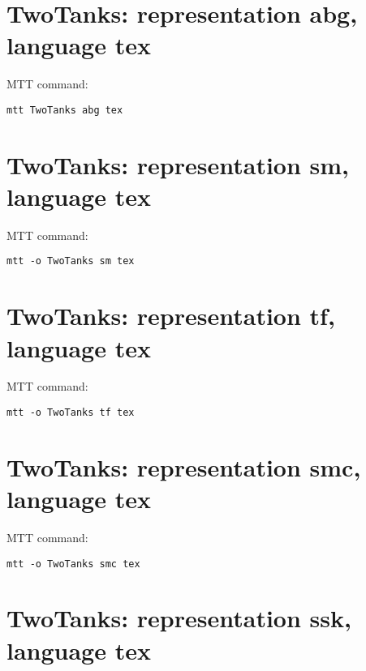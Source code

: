 

\section{\textbf{TwoTanks}: representation \textbf{abg}, language \textbf{tex}}
\label{sec:TwoTanks_abg.tex}


MTT command:
\begin{verbatim}
mtt TwoTanks abg tex 
\end{verbatim}
  


\section{\textbf{TwoTanks}: representation \textbf{sm}, language \textbf{tex}}
\label{sec:TwoTanks_sm.tex}


MTT command:
\begin{verbatim}
mtt -o TwoTanks sm tex 
\end{verbatim}
  


\section{\textbf{TwoTanks}: representation \textbf{tf}, language \textbf{tex}}
\label{sec:TwoTanks_tf.tex}


MTT command:
\begin{verbatim}
mtt -o TwoTanks tf tex 
\end{verbatim}
  


\section{\textbf{TwoTanks}: representation \textbf{smc}, language \textbf{tex}}
\label{sec:TwoTanks_smc.tex}


MTT command:
\begin{verbatim}
mtt -o TwoTanks smc tex 
\end{verbatim}
  


\section{\textbf{TwoTanks}: representation \textbf{ssk}, language \textbf{tex}}
\label{sec:TwoTanks_ssk.tex}


